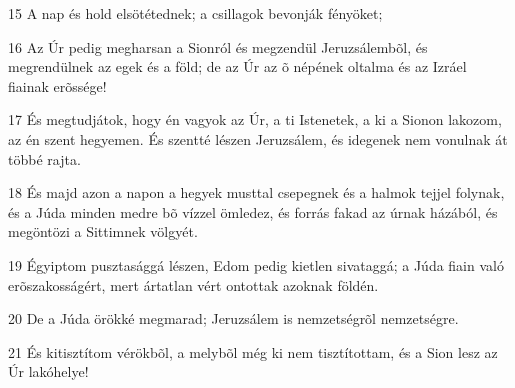 \par 15 A nap és hold elsötétednek; a csillagok bevonják fényöket;
\par 16 Az Úr pedig megharsan a Sionról és megzendül Jeruzsálembõl, és megrendülnek az egek és a föld; de az Úr az õ népének oltalma és az Izráel fiainak erõssége!
\par 17 És megtudjátok, hogy én vagyok az Úr, a ti Istenetek, a ki a Sionon lakozom, az én szent hegyemen. És szentté lészen Jeruzsálem,  és idegenek nem vonulnak át többé rajta.
\par 18 És majd azon a napon a hegyek musttal csepegnek és a halmok tejjel folynak, és a Júda minden medre bõ vízzel ömledez, és forrás fakad  az úrnak házából, és megöntözi a Sittimnek völgyét.
\par 19 Égyiptom pusztasággá lészen, Edom pedig kietlen sivataggá; a Júda fiain való erõszakosságért, mert ártatlan vért ontottak azoknak földén.
\par 20 De a Júda örökké megmarad; Jeruzsálem is nemzetségrõl nemzetségre.
\par 21 És kitisztítom vérökbõl, a melybõl még ki nem tisztítottam, és a Sion lesz az Úr lakóhelye!


